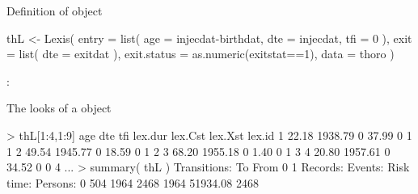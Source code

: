 \begin{frame}[fragile]{Definition of  object}
 \small
 \vspace*{-1em}
\renewcommand{\baselinestretch}{0.9}
\begin{semiverbatim}
thL <- Lexis( \alert<2>{entry = list( age = injecdat-birthdat,
                            \alert<5->{dte = injecdat},
                            tfi = 0 )},
               \alert<3>{exit = list( \alert<5->{dte = exitdat} )},
        exit.status = as.numeric(exitstat==1),
               data = thoro )
\end{semiverbatim}
\renewcommand{\baselinestretch}{1.0}
\normalsize
{} : 

\end{frame}

\begin{frame}[fragile]{The looks of a  object}
\small
\renewcommand{\baselinestretch}{0.9}
\begin{semiverbatim}
> thL[1:4,1:9]
    age     dte tfi \alert<3>{lex.dur} \alert<5>{lex.Cst} \alert<4>{lex.Xst} lex.id
1 22.18 1938.79   0 \alert<3>{  37.99} \alert<5>{      0} \alert<4>{      1}      1
2 49.54 1945.77   0 \alert<3>{  18.59} \alert<5>{      0} \alert<4>{      1}      2
3 68.20 1955.18   0 \alert<3>{   1.40} \alert<5>{      0} \alert<4>{      1}      3
4 20.80 1957.61   0 \alert<3>{  34.52} \alert<5>{      0} \alert<4>{      0}      4
...
\pause
> summary( thL )
Transitions:
     \alert<4>{To}
\alert<5>{From} \alert<4>{  0    1} Records:  \alert<4>{Events:}  \alert<3>{Risk time:}  Persons:
\alert<5>{   0} \alert<4>{504 1964}     2468  \alert<4>{   1964}  \alert<3>{  51934.08}      2468
\end{semiverbatim}
\renewcommand{\baselinestretch}{1.0}
\end{frame}


